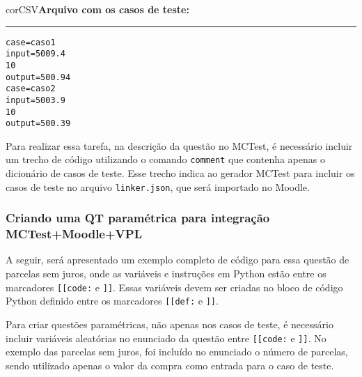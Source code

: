 \begin{myboxCode}{corCSV}{\textbf{Arquivo com os casos de teste:}}\vspace{3mm}
\hrule
\begin{verbatim}
case=caso1
input=5009.4
10
output=500.94
case=caso2
input=5003.9
10
output=500.39
\end{verbatim}
\end{myboxCode}

Para realizar essa tarefa, na descrição da questão no MCTest, é necessário incluir um trecho de código utilizando o comando \verb|comment| que contenha apenas o dicionário de casos de teste. Esse trecho indica ao gerador MCTest para incluir os casos de teste no arquivo \verb|linker.json|, que será importado no Moodle.

\subsubsection{Criando uma QT paramétrica para integração MCTest+Moodle+VPL}

A seguir, será apresentado um exemplo completo de código para essa questão de parcelas sem juros, onde as variáveis e instruções em Python estão entre os marcadores \verb|[[code:| e \verb|]]|. Essas variáveis devem ser criadas no bloco de código Python definido entre os marcadores \verb|[[def:| e \verb|]]|.

Para criar questões paramétricas, não apenas nos casos de teste, é necessário incluir variáveis aleatórias no enunciado da questão entre \verb|[[code:| e \verb|]]|. No exemplo das parcelas sem juros, foi incluído no enunciado o número de parcelas, sendo utilizado apenas o valor da compra como entrada para o caso de teste.



